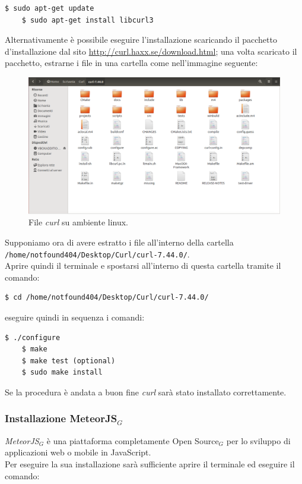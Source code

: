 \begin{lstlisting}[style=DOS]
	$ sudo apt-get update
	$ sudo apt-get install libcurl3
\end{lstlisting}

\noindent Alternativamente è possibile eseguire l'installazione scaricando il pacchetto d'installazione dal sito \href{http://curl.haxx.se/download.html}{http://curl.haxx.se/download.html}; una volta scaricato il pacchetto, estrarne i file in una cartella come nell'immagine seguente:

\begin{figure}[h]
\begin{center}
\includegraphics[scale=0.3]{img/curl_files_linux.png}
\caption{File \emph{curl} su ambiente linux.}
\end{center}
\end{figure}

\newpage
\noindent Supponiamo ora di avere estratto i file all'interno della cartella \\
\verb+/home/notfound404/Desktop/Curl/curl-7.44.0/+.\\
Aprire quindi il terminale e spostarsi all'interno di questa cartella tramite il comando:

\begin{lstlisting}[style=DOS]
	$ cd /home/notfound404/Desktop/Curl/curl-7.44.0/
\end{lstlisting}

\noindent eseguire quindi in sequenza i comandi:

\begin{lstlisting}[style=DOS]
	$ ./configure
	$ make
	$ make test (optional)
	$ sudo make install
\end{lstlisting}
Se la procedura è andata a buon fine \emph{curl} sarà stato installato correttamente.

\subsubsection{Installazione MeteorJS$_G$}
\emph{MeteorJS$_G$} è una piattaforma completamente Open Source$_G$ per lo sviluppo di applicazioni web o mobile in JavaScript.\\
Per eseguire la sua installazione sarà sufficiente aprire il terminale ed eseguire il comando:

